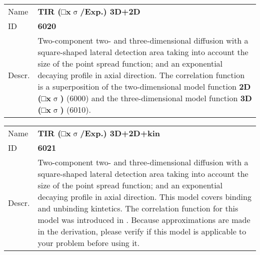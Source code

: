 \noindent \begin{tabular}{lp{}}
Name & \textbf{TIR (□x$\upsigma$/Exp.) 3D+2D} \\ 
ID & \textbf{6020} \\ 
Descr. &  Two-component two- and three-dimensional diffusion with a square-shaped lateral detection area taking into account the size of the point spread function; and an exponential decaying profile in axial direction.  \newline
The correlation function is a superposition of the two-dimensional model function \textbf{2D (□x$\upsigma$)} (6000) and the three-dimensional model function \textbf{3D (□x$\upsigma$)} (6010)\cite{Ries2008390, Yordanov2011}.
\end{tabular}
\vspace{2em}


\noindent \begin{tabular}{lp{}}
Name & \textbf{TIR (□x$\upsigma$/Exp.) 3D+2D+kin} \\ 
ID & \textbf{6021} \\ 
Descr. &  Two-component two- and three-dimensional diffusion with a square-shaped lateral detection area taking into account the size of the point spread function; and an exponential decaying profile in axial direction. This model covers binding and unbinding kintetics.  \newline 
The correlation function for this model was introduced in \cite{Ries2008390}. Because approximations are made in the derivation, please verify if this model is applicable to your problem before using it.
\end{tabular}
\vspace{2em}


